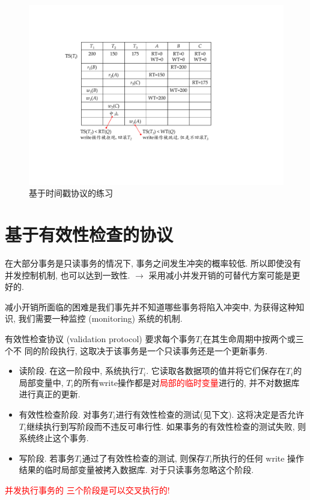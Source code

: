 \begin{figure}[H]
    \centering
    \includegraphics[width=.7\textwidth]{figure/时间戳.pdf}
    \caption{基于时间戳协议的练习}
\end{figure}

\section{基于有效性检查的协议}

在大部分事务是只读事务的情况下, 事务之间发生冲突的概率较低. 所以即使没有并发控制机制, 也可以达到一致性. $\to$ 采用减小并发开销的可替代方案可能是更好的.

减小开销所面临的困难是我们事先并不知道哪些事务将陷入冲突中, 为获得这种知识, 我们需要一种监控 (monitoring) 系统的机制.

\begin{definition}
有效性检查协议 (validation protocol) 要求每个事务$T_i$在其生命周期中按两个或三个不
同的阶段执行, 这取决于该事务是一个只读事务还是一个更新事务.
\begin{itemize}
  \item 读阶段. 在这一阶段中, 系统执行$T_i$. 它读取各数据项的值并将它们保存在$T_i$的局部变量中, $T_i$的所有write操作都是对\textcolor{red}{局部的临时变量}进行的, 并不对数据库进行真正的更新.
  \item 有效性检查阶段. 对事务$T_i$进行有效性检查的测试(见下文). 这将决定是否允许$T_i$继续执行到写阶段而不违反可串行性. 如果事务的有效性检查的测试失败, 则系统终止这个事务.
  \item 写阶段. 若事务$T_i$通过了有效性检查的测试, 则保存$T_i$所执行的任何 write 操作结果的临时局部变量被拷入数据库. 对于只读事务忽略这个阶段.
\end{itemize}
\end{definition}

\textcolor{red}{并发执行事务的 三个阶段是可以交叉执行的!}

